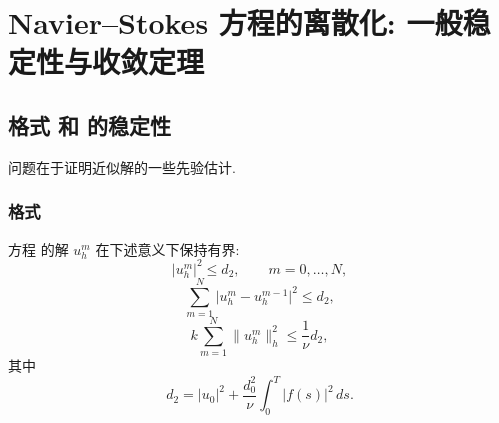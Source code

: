 \setcounter{section}{4}
\section{Navier--Stokes 方程的离散化: 一般稳定性与收敛定理}
\label{sec:sample-general-stability-convergence}
\setcounter{subsection}{1}
\setcounter{equation}{20}

\subsection{格式  和  的稳定性}
\label{sec:sample-scheme-stability}

问题在于证明近似解的一些先验估计.

\subsubsection{格式 }
\label{subsec:sample-scheme-51}

\begin{Lemma}
\label{lem:sample-scheme-51-bounds}
方程  的解 $u_h^m$ 在下述意义下保持有界:
\begin{equation}
  \lvert u_h^m\rvert^2 \leq d_2, \qquad m=0,\ldots,N,
  \label{eq:sample-scheme51-uniform-bound}
\end{equation}
\begin{equation}
  \sum_{m=1}^{N}\lvert u_h^m-u_h^{m-1}\rvert^2 \leq d_2,
  \label{eq:sample-scheme51-increment-bound}
\end{equation}
\begin{equation}
  k\sum_{m=1}^{N}\lVert u_h^m\rVert_h^2 \leq \frac{1}{\nu}d_2,
  \label{eq:sample-scheme51-energy-bound}
\end{equation}
其中
\begin{equation}
  d_2=\lvert u_0\rvert^2+\frac{d_0^2}{\nu}\int_0^T\lvert f(s)\rvert^2\,ds.
  \label{eq:sample-data-bound-d2}
\end{equation}
\end{Lemma}

